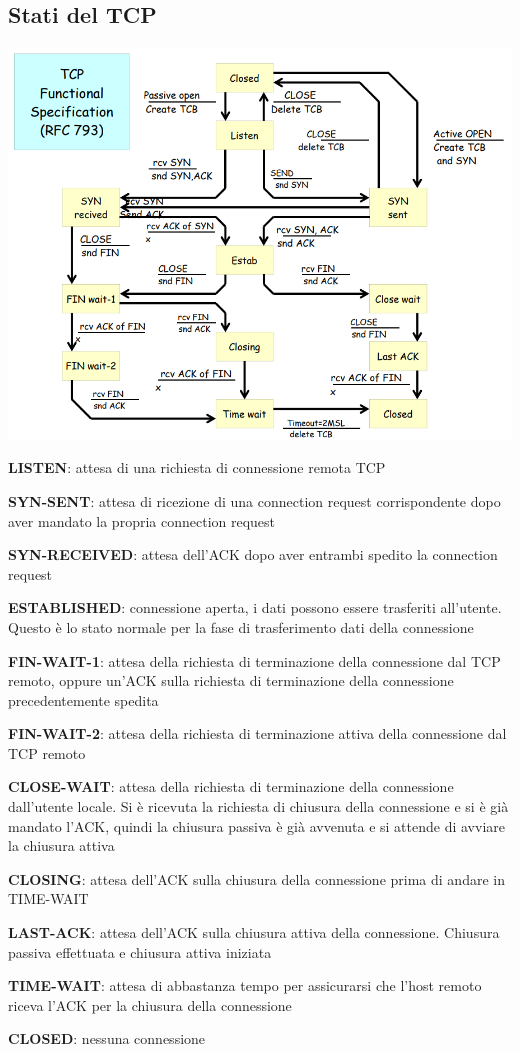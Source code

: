 \documentclass[10pt]{article}
\begin{document}
\subsection{Stati del TCP}
\begin{center}
\includegraphics[scale=0.7]{tcpstates.png}
\end{center}
\begin{list}{}{Gli stati del TCP:}
\item \textbf{LISTEN}: attesa di una richiesta di connessione remota TCP
\item \textbf{SYN-SENT}: attesa di ricezione di una connection request corrispondente dopo aver mandato la propria connection request
\item \textbf{SYN-RECEIVED}: attesa dell'ACK dopo aver entrambi spedito la connection request
\item \textbf{ESTABLISHED}: connessione aperta, i dati possono essere trasferiti all'utente. Questo è lo stato normale per la fase di trasferimento dati della connessione
\item \textbf{FIN-WAIT-1}: attesa della richiesta di terminazione della connessione dal TCP remoto, oppure un'ACK sulla richiesta di terminazione della connessione precedentemente spedita
\item \textbf{FIN-WAIT-2}: attesa della richiesta di terminazione attiva della connessione dal TCP remoto
\item \textbf{CLOSE-WAIT}: attesa della richiesta di terminazione della connessione dall'utente locale. Si è ricevuta la richiesta di chiusura della connessione e si è già mandato l'ACK, quindi la chiusura passiva è già avvenuta e si attende di avviare la chiusura attiva
\item \textbf{CLOSING}: attesa dell'ACK sulla chiusura della connessione prima di andare in TIME-WAIT
\item \textbf{LAST-ACK}: attesa dell'ACK sulla chiusura attiva della connessione. Chiusura passiva effettuata e chiusura attiva iniziata
\item \textbf{TIME-WAIT}: attesa di abbastanza tempo per assicurarsi che l'host remoto riceva l'ACK per la chiusura della connessione
\item \textbf{CLOSED}: nessuna connessione
\end{list}
\pagebreak
\end{document}
